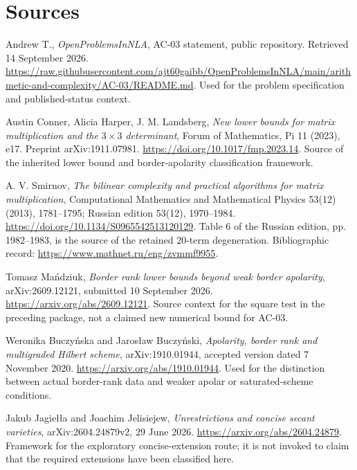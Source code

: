 \documentclass[11pt]{article}
\theoremstyle{definition}\newtheorem{definition}[theorem]{Definition}
\theoremstyle{remark}\newtheorem{remark}[theorem]{Remark}
\begin{document}
\section*{Sources}
\begingroup
\raggedright
\begin{enumerate}[label={[\arabic*]},leftmargin=2em]
\item Andrew T., \emph{OpenProblemsInNLA}, AC-03 statement, public repository.
Retrieved 14 September 2026.
\url{https://raw.githubusercontent.com/ajt60gaibb/OpenProblemsInNLA/main/arithmetic-and-complexity/AC-03/README.md}.
Used for the problem specification and published-status context.

\item Austin Conner, Alicia Harper, J. M. Landsberg,
\emph{New lower bounds for matrix multiplication and the $3\times3$ determinant},
Forum of Mathematics, Pi 11 (2023), e17. Preprint arXiv:1911.07981.
\url{https://doi.org/10.1017/fmp.2023.14}.
Source of the inherited lower bound and border-apolarity classification framework.

\item A. V. Smirnov, \emph{The bilinear complexity and practical algorithms
for matrix multiplication}, Computational Mathematics and Mathematical Physics
53(12) (2013), 1781--1795; Russian edition 53(12), 1970--1984.
\url{https://doi.org/10.1134/S0965542513120129}.
Table 6 of the Russian edition, pp. 1982--1983, is the source of the retained
20-term degeneration. Bibliographic record:
\url{https://www.mathnet.ru/eng/zvmmf9955}.

\item Tomasz Ma\'ndziuk, \emph{Border rank lower bounds beyond weak border
apolarity}, arXiv:2609.12121, submitted 10 September 2026.
\url{https://arxiv.org/abs/2609.12121}.
Source context for the square test in the preceding package, not a claimed
new numerical bound for AC-03.

\item Weronika Buczy\'nska and Jaros\l aw Buczy\'nski,
\emph{Apolarity, border rank and multigraded Hilbert scheme}, arXiv:1910.01944,
accepted version dated 7 November 2020.
\url{https://arxiv.org/abs/1910.01944}.
Used for the distinction between actual border-rank data and weaker apolar
or saturated-scheme conditions.

\item Jakub Jagie\l\l a and Joachim Jelisiejew,
\emph{Unrestrictions and concise secant varieties}, arXiv:2604.24879v2,
29 June 2026.
\url{https://arxiv.org/abs/2604.24879}.
Framework for the exploratory concise-extension route; it is not invoked
to claim that the required extensions have been classified here.


\end{enumerate}
\end{document}
